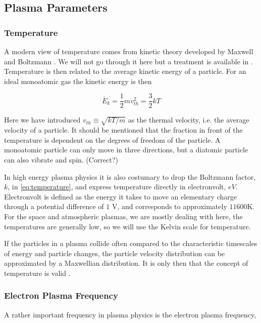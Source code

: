     \subsection{Plasma Parameters}
		\label{sec:parameters}
		\subsubsection{Temperature}
		A modern view of temperature comes from kinetic theory developed by
		Maxwell and Boltzmann \citep{swendsen_statistical_2006}. We will not go through it
		here but a treatment is available in \citet{goldston_introduction_1995}.
		Temperature is then related to the average kinetic energy of a particle.
		For an ideal monoatomic gas the kinetic energy is then

		\begin{equation}
			\bar{E}_k = \frac{1}{2} m v_{th}^2 = \frac{3}{2} kT \label{eq:temperature}
		\end{equation}

		Here we have introduced \(v_{th} \equiv  \sqrt{kT/m}\) as the thermal velocity, i.e.
		the average velocity of a particle. It should be mentioned that the fraction in
		front of the temperature is dependent on the degrees of freedom of the particle.
		A monoatomic particle can only move in three directions, but a diatomic particle
		can also vibrate and spin. (Correct?)

		In high energy plasma physics it is also costumary to drop the Boltzmann factor, \(k\),
		in \cref{eq:temperature}, and express temperature directly in electronvolt, \(eV\).
		Electronvolt is defined as the energy it takes to move an elementary charge through
		a potential difference of \(1\) \si{\volt}, and corresponds to approximately
		\(11600 \si{\kelvin}\). For the space and atmospheric plasmas, we are mostly
		dealing with here, the temperatures are generally low, so we will use the Kelvin scale
		for temperature.

		If the particles in a plasma collide often compared to the characteristic timescales
		of energy and particle changes, the particle velocity distribution can be approximated
		by a Maxwellian distribution. It is only then that the concept of
		temperature is valid \citep{goldston_introduction_1995}.

		\subsubsection{Electron Plasma Frequency}
		A rather important frequency in plasma physics is the electron plasma frequency,

